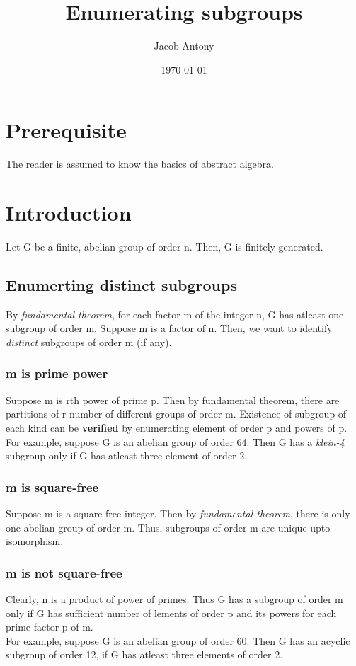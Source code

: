 \documentclass{article}
\title{Enumerating subgroups}
\author{Jacob Antony}
\date{\today}
\begin{document}
\maketitle

\tableofcontents

\section*{Prerequisite}
The reader is assumed to know the basics of abstract algebra.

\section{Introduction}
Let G be a finite, abelian group of order n. Then, G is finitely generated. 

\subsection{Enumerting distinct subgroups}
By \textit{fundamental theorem}, for each factor m of the integer n, G has atleast one subgroup of order m. Suppose m is a factor of n. Then, we want to identify \textit{distinct} subgroups of order m (if any).

\subsubsection*{m is prime power}
Suppose m is rth power of prime p. Then by fundamental theorem, there are partitions-of-r number of different groups of order m. Existence of subgroup of each kind can be \textbf{verified} by enumerating element of order p and powers of p.\\ For example, suppose G is an abelian group of order 64. Then G has a \textit{klein-4} subgroup only if G has atleast three element of order 2. 

\subsubsection*{m is square-free}
Suppose m is a square-free integer. Then by \textit{fundamental theorem}, there is only one abelian group of order m. Thus, subgroups of order m are unique upto isomorphism.

\subsubsection*{m is not square-free}
Clearly, n is a product of power of primes. Thus G has a subgroup of order m only if G has sufficient number of lements of order p and its powers for each prime factor p of m.\\ For example, suppose G is an abelian group of order 60. Then G has an acyclic subgroup of order 12, if G has atleast three elements of order 2.
\end{document}
